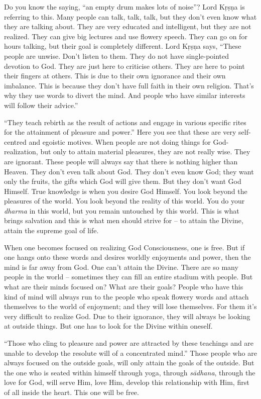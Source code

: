 Do you know the saying, “an empty drum makes lots of noise”? Lord Kṛṣṇa is referring to this. Many people can talk, talk, talk, but they don’t even know what they are talking about. They are very educated and intelligent, but they are not realized. They can give big lectures and use flowery speech. They can go on for hours talking, but their goal is completely different. Lord Kṛṣṇa says, “These people are unwise. Don’t listen to them. They do not have single-pointed devotion to God. They are just here to criticise others. They are here to point their fingers at others. This is due to their own ignorance and their own imbalance. This is because they don’t have full faith in their own religion. That’s why they use words to divert the mind. And people who have similar interests will follow their advice.”

“They teach rebirth as the result of actions and engage in various specific rites for the attainment of pleasure and power.” Here you see that these are very self-centred and egoistic motives. When people are not doing things for God-realization, but only to attain material pleasures, they are not really wise. They are ignorant. These people will always say that there is nothing higher than Heaven. They don’t even talk about God. They don’t even know God; they want only the fruits, the gifts which God will give them. But they don’t want God Himself. True knowledge is when you desire God Himself. You look beyond the pleasures of the world. You look beyond the reality of this world. You do your \textit{dharma} in this world, but you remain untouched by this world. This is what brings salvation and this is what men should strive for – to attain the Divine, attain the supreme goal of life.

When one becomes focused on realizing God Consciousness, one is free. But if one hangs onto these words and desires worldly enjoyments and power, then the mind is far away from God. One can’t attain the Divine. There are so many people in the world -- sometimes they can fill an entire stadium with people. But what are their minds focused on? What are their goals? People who have this kind of mind will always run to the people who speak flowery words and attach themselves to the world of enjoyment; and they will lose themselves. For them it’s very difficult to realize God. Due to their ignorance, they will always be looking at outside things. But one has to look for the Divine within oneself.

“Those who cling to pleasure and power are attracted by these teachings and are unable to develop the resolute will of a concentrated mind.” Those people who are always focused on the outside goals, will only attain the goals of the outside. But the one who is seated within himself through yoga, through \textit{sādhana}, through the love for God, will serve Him, love Him, develop this relationship with Him, first of all inside the heart. This one will be free.

